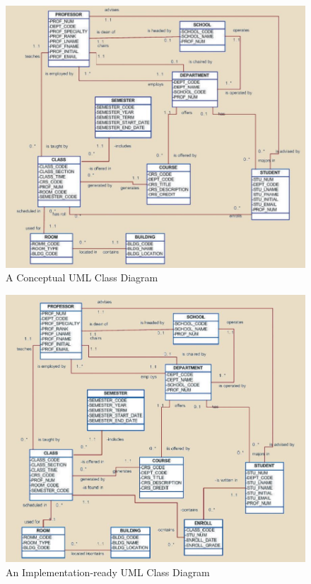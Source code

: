 \documentclass[a4paper, 12pt, titlepage]{report}
\begin{document}
{\begin{figure}[H]
\includegraphics[scale=0.7]{UML1}
\caption{A Conceptual UML Class Diagram}
\end{figure}
\begin{figure}[H]
\centering
\includegraphics[scale=0.7]{UML2}
\caption{An Implementation-ready UML Class Diagram}
\end{figure}
}
\end{document}
